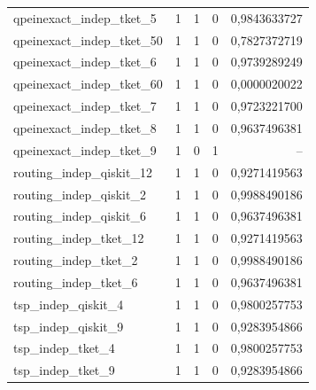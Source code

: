 \begin{longtable}{lrrrr}
qpeinexact\_indep\_tket\_5 & 1 & 1 & 0 & 0,9843633727 \\
qpeinexact\_indep\_tket\_50 & 1 & 1 & 0 & 0,7827372719 \\
qpeinexact\_indep\_tket\_6 & 1 & 1 & 0 & 0,9739289249 \\
qpeinexact\_indep\_tket\_60 & 1 & 1 & 0 & 0,0000020022 \\
qpeinexact\_indep\_tket\_7 & 1 & 1 & 0 & 0,9723221700 \\
qpeinexact\_indep\_tket\_8 & 1 & 1 & 0 & 0,9637496381 \\
qpeinexact\_indep\_tket\_9 & 1 & 0 & 1 & -- \\
routing\_indep\_qiskit\_12 & 1 & 1 & 0 & 0,9271419563 \\
routing\_indep\_qiskit\_2 & 1 & 1 & 0 & 0,9988490186 \\
routing\_indep\_qiskit\_6 & 1 & 1 & 0 & 0,9637496381 \\
routing\_indep\_tket\_12 & 1 & 1 & 0 & 0,9271419563 \\
routing\_indep\_tket\_2 & 1 & 1 & 0 & 0,9988490186 \\
routing\_indep\_tket\_6 & 1 & 1 & 0 & 0,9637496381 \\
tsp\_indep\_qiskit\_4 & 1 & 1 & 0 & 0,9800257753 \\
tsp\_indep\_qiskit\_9 & 1 & 1 & 0 & 0,9283954866 \\
tsp\_indep\_tket\_4 & 1 & 1 & 0 & 0,9800257753 \\
tsp\_indep\_tket\_9 & 1 & 1 & 0 & 0,9283954866 \\
\end{longtable}
\endgroup
